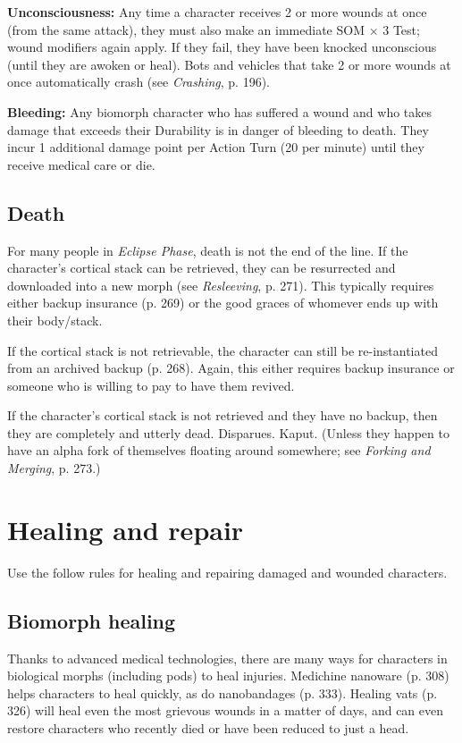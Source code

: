 \textbf{Unconsciousness:} Any time a character receives 2 or more wounds at once (from the same attack), they must also make an immediate SOM $\times$ 3 Test; wound modifiers again apply. If they fail, they have been knocked unconscious (until they are awoken or heal). Bots and vehicles that take 2 or more wounds at once automatically crash (see \emph{Crashing}, p. 196). 

\textbf{Bleeding:} Any biomorph character who has suffered a wound and who takes damage that exceeds their Durability is in danger of bleeding to death. They incur 1 additional damage point per Action Turn (20 per minute) until they receive medical care or die. 

\subsection{Death} For many people in \emph{Eclipse Phase}, death is not the end of the line. If the character’s cortical stack can be retrieved, they can be resurrected and downloaded into a new morph (see \emph{Resleeving}, p. 271). This typically requires either backup insurance (p. 269) or the good graces of whomever ends up with their body/stack. 

If the cortical stack is not retrievable, the character can still be re-instantiated from an archived backup (p. 268). Again, this either requires backup insurance or someone who is willing to pay to have them revived. 

If the character’s cortical stack is not retrieved and they have no backup, then they are completely and utterly dead. Disparues. Kaput. (Unless they happen to have an alpha fork of themselves floating around somewhere; see \emph{Forking and Merging}, p. 273.) 



\section{Healing and repair} \label{sec:healing-repair} 

Use the follow rules for healing and repairing damaged and wounded characters. 

\subsection{Biomorph healing} 

Thanks to advanced medical technologies, there are many ways for characters in biological morphs (including pods) to heal injuries. Medichine nanoware (p. 308) helps characters to heal quickly, as do nanobandages (p. 333). Healing vats (p. 326) will heal even the most grievous wounds in a matter of days, and can even restore characters who recently died or have been reduced to just a head. 

